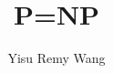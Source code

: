 \documentclass[acmsmall,screen,review,anonymous]{acmart}
\author{Yisu Remy Wang}
\affiliation{
  \institution{University of Washington}
 \country{USA}
}
\begin{document}
\title{P=NP}

\begin{abstract}
  
\end{abstract}

\keywords{}

\maketitle


% 
% 
% 
% 
% 
% 
% 
% 

\begin{acks}
\end{acks}



\end{document}
